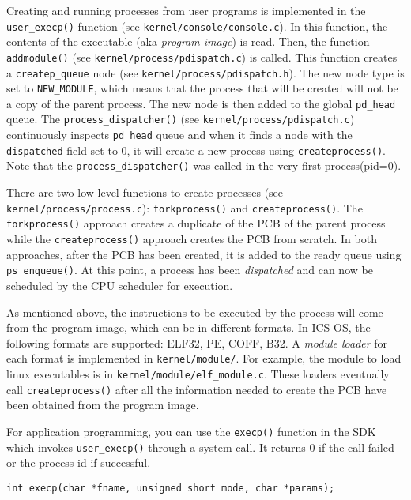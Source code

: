 \documentclass[a4paper, 11pt,oneside]{article}
\begin{document}
Creating and running processes from user programs is implemented in the \texttt{user\_execp()} function (see \texttt{kernel/console/console.c}). In this function, the contents of the executable (aka \textit{program image}) is read. Then, the function \texttt{addmodule()} (see \texttt{kernel/process/pdispatch.c}) is called. 
This function creates a \texttt{createp\_queue} node (see \texttt{kernel/process/pdispatch.h}). The new node type is set to \texttt{NEW\_MODULE}, which means that the process that will be created will not be a copy of the parent process. The new node is then added to the global \texttt{pd\_head} queue. The \texttt{process\_dispatcher()} (see \texttt{kernel/process/pdispatch.c}) continuously inspects \texttt{pd\_head} queue and when it finds a node with  the \texttt{dispatched} field set to 0, it will create a new process using \texttt{createprocess()}. Note that the \texttt{process\_dispatcher()} was called in the very first process(pid=0).  

There are two low-level functions to create processes (see \texttt{kernel/process/process.c}): \texttt{forkprocess()} and \texttt{createprocess()}. 
The \texttt{forkprocess()} approach creates a duplicate of the PCB of the parent process while the \texttt{createprocess()} approach creates the PCB from scratch. In both approaches, after the PCB has been created, it is added to the ready queue using \texttt{ps\_enqueue()}. At this point, a process has been \textit{dispatched} and can now be scheduled by the CPU scheduler for execution. 

As mentioned above, the instructions to be executed by the process will come from the program image, which can 
be in different formats. In ICS-OS, the following formats are supported: ELF32, PE, COFF, B32. A \textit{module loader} for each format is implemented in \texttt{kernel/module/}. For example, the module to load linux executables is in \texttt{kernel/module/elf\_module.c}. These loaders 
eventually call \texttt{createprocess()} after all the information needed to create the PCB have been obtained from the program image.

For application programming, you can use the \texttt{execp()} function in the SDK which invokes  
\texttt{user\_execp()} through a system call. It returns 0 if the call failed or the process id if successful. 

\begin{verbatim}
int execp(char *fname, unsigned short mode, char *params);
\end{verbatim}
\end{document}
